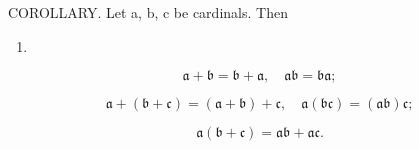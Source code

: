 COROLLARY. Let a, b, c be cardinals. Then

\begin{enumerate}
\def\labelenumi{(\arabic{enumi})}
\tightlist
\item
\end{enumerate}

\[
\mathfrak {a} + \mathfrak {b} = \mathfrak {b} + \mathfrak {a}, \quad \mathfrak {a}\mathfrak {b} = \mathfrak {b}\mathfrak {a};\tag{2}
\]

\[
\mathfrak {a} + (\mathfrak {b} + \mathfrak {c}) = (\mathfrak {a} + \mathfrak {b}) + \mathfrak {c}, \quad \mathfrak {a}(\mathfrak {b}\mathfrak {c}) = (\mathfrak {a}\mathfrak {b})\mathfrak {c};\tag{3}
\]

\[
\mathfrak {a} (\mathfrak {b} + \mathfrak {c}) = \mathfrak {a}\mathfrak {b} + \mathfrak {a}\mathfrak {c}.
\]

